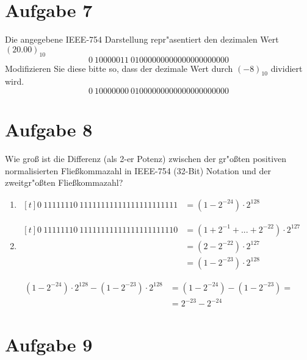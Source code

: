 \documentclass[10pt, oneside]{article}
\begin{document}
\section{Aufgabe 7}

Die angegebene IEEE-754 Darstellung repr"asentiert den dezimalen Wert $(20.00)_{10}$
\begin{equation*}
    0\ 10000011\ 01000000000000000000000
\end{equation*}
Modifizieren Sie diese bitte so, dass der dezimale Wert durch $(-8)_{10}$
dividiert wird.
\begin{equation*}
    0\ 10000000\ 01000000000000000000000
\end{equation*}

\section{Aufgabe 8}

Wie gro{\ss} ist die Differenz (als 2-er Potenz) zwischen der gr"o{\ss}ten
positiven normalisierten Flie{\ss}kommazahl in IEEE-754 (32-Bit) Notation und der
zweitgr"o{\ss}ten Fließkommazahl?
\begin{enumerate}
    \item $\begin{aligned}[t]
            0\ 11111110\ 11111111111111111111111 &= (1 - 2^{-24}) \cdot 2^{128}
        \end{aligned}$
    \item $\begin{aligned}[t]
            0\ 11111110\ 11111111111111111111110 &= (1 + 2^{-1} + ... + 2^{-22}) \cdot 2^{127} \\
                                                 &= (2 - 2^{-22}) \cdot 2^{127} \\
                                                 &= (1 - 2^{-23}) \cdot 2^{128}
        \end{aligned}$
\end{enumerate}
\begin{align*}
    (1 - 2^{-24}) \cdot 2^{128} - (1 - 2^{-23}) \cdot 2^{128} &= (1 - 2^{-24}) - (1 - 2^{-23}) = \\
                                                              &= 2^{-23} - 2^{-24}
\end{align*}

\section{Aufgabe 9}
\end{document}
